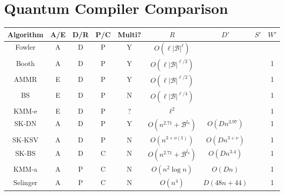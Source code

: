 \section{Quantum Compiler Comparison}
\label{sec:qcompile-compare}

\begin{landscape}

\begin{table}[hbt!]
\begin{tabular}{|c|c|c|c|c|c|c|c|c|}
\hline
Algorithm                  & A/E & D/R & P/C & Multi? & $R$                             & $D'$                    & $S'$                  & $W'$ \\
\hline
Fowler\cite{Fowler2011}     & A   & D   & P  & Y    & $O(\ell |\mathcal{B}|^{\ell})$    &                         &                       &     \\
Booth \cite{Booth2012}      & A   & D   & P  & Y    & $O(\ell |\mathcal{B}|^{\ell/2})$  &                         &                       & 1    \\
AMMR \cite{Amy2012}         & E   & D   & P  & Y    & $O(\ell |\mathcal{B}|^{\ell/2})$  &                         &                       & 1    \\
BS \cite{Bocharov2012}      & E   & D   & P  & N    & $O(\ell |\mathcal{B}|^{\ell/4})$  &                         &                       & 1    \\
KMM-e\cite{Kliuchnikov2012e} & E   & D   & P  & ?    & $\ell^2$                          &                         &                       & 1    \\
SK-DN\cite{Dawson2005}      & A   & D   & P  & Y    & $O(n^{2.71} + \mathcal{B}^{l_0})$ & $O(D n^{3.97})$         &                       & 1    \\
SK-KSV\cite{Kitaev2002}     & A   & D   & P  & N    & $O(n^{3+o(1)})$                   & $O(D n^{3+\nu})$        &                       & 1    \\
SK-BS \cite{Bocharov2012}   & A   & D   & C  & N    & $O(n^{2.71} + \mathcal{B}^{l_0})$ & $O(Dn^{3.4})$           &                       & 1    \\
KMM-a\cite{Kliuchnikov2012a}& A   & P   & C  & N    & $O(n^2\log n)$                    & $O(Dn)$                 &                       & 1    \\
Selinger\cite{Selinger2012} & A   & P   & C  & N    & $O(n^4)$                          & $D(48n + 44)$           &                       & 1    \\

\end{tabular}
\end{table}
\end{landscape}
